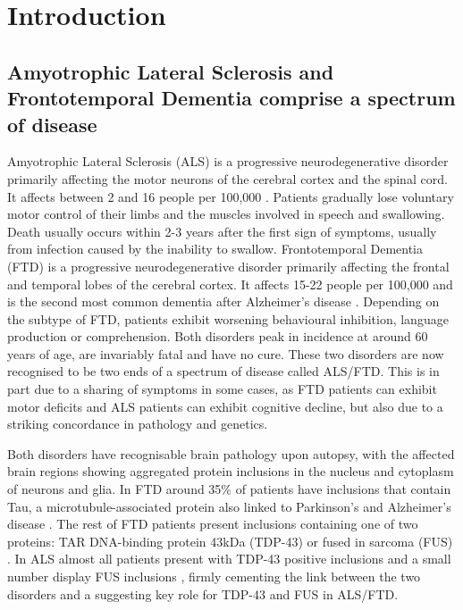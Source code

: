 
\chapter{Introduction}

\section{Amyotrophic Lateral Sclerosis and Frontotemporal Dementia comprise a spectrum of disease} %

Amyotrophic Lateral Sclerosis (ALS) is a progressive neurodegenerative disorder primarily affecting the motor neurons of the cerebral cortex and the spinal cord. It affects between 2 and 16 people per 100,000 \citep{Logroscino2010}. 
Patients gradually lose voluntary motor control of their limbs and the muscles involved in speech and swallowing. 
Death usually occurs within 2-3 years after the first sign of symptoms, usually from infection caused by the inability to swallow. 
Frontotemporal Dementia (FTD) is a progressive neurodegenerative disorder primarily affecting the frontal and temporal lobes of the cerebral cortex. 
It affects 15-22 people per 100,000 and is the second most common dementia after Alzheimer's disease \citep{Onyike2013}. 
Depending on the subtype of FTD, patients exhibit worsening behavioural inhibition, language production or comprehension. 
Both disorders peak in incidence at around 60 years of age, are invariably fatal and have no cure. 
These two disorders are now recognised to be two ends of a spectrum of disease called ALS/FTD. 
This is in part due to a sharing of symptoms in some cases, as FTD patients can exhibit motor deficits and ALS patients can exhibit cognitive decline, but also due to a striking concordance in pathology and genetics.  %

Both disorders have recognisable brain pathology upon autopsy, with the affected brain regions showing aggregated protein inclusions in the nucleus and cytoplasm of neurons and glia. In FTD around 35\% of patients have inclusions that contain Tau, a microtubule-associated protein also linked to Parkinson's and Alzheimer's disease \citep{Rademakers2004}. 
The rest of FTD patients present inclusions containing one of two proteins: TAR DNA-binding protein 43kDa (TDP-43) \citep{Neumann2006, Arai2006} or fused in sarcoma (FUS) \citep{Neumann2009}. In ALS almost all patients present with TDP-43 positive inclusions \citep{Neumann2006, Arai2006} and a small number display FUS inclusions \citep{Vance2009-ye,Kwiatkowski2009}, firmly cementing the link between the two disorders and a suggesting key role for TDP-43 and FUS in ALS/FTD.

